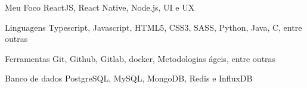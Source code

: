 
\begin{cvskills}
  \cvskill
    {Meu Foco}
    {ReactJS, React Native, Node.js, UI e UX}
  
  \cvskill
    {Linguagens}
    {Typescript, Javascript, HTML5, CSS3, SASS, Python, Java, C, entre outras}

  \cvskill
    {Ferramentas}
    {Git, Github, Gitlab, docker, Metodologias ágeis, entre outras}

  \cvskill
    {Banco de dados}
    {PostgreSQL, MySQL, MongoDB, Redis e InfluxDB}
    
\end{cvskills}
